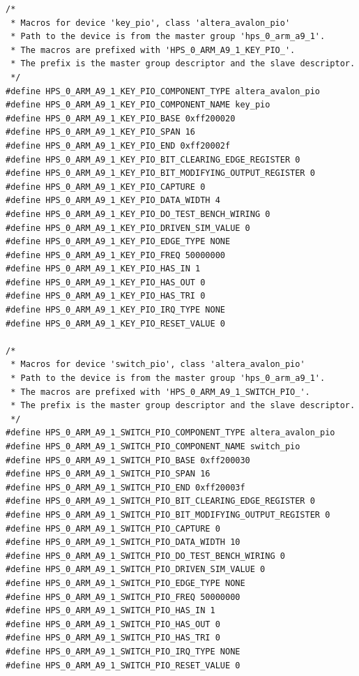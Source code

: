 \documentclass[conference]{IEEEtran}
\begin{document}
\begin{lstlisting}
/*
 * Macros for device 'key_pio', class 'altera_avalon_pio'
 * Path to the device is from the master group 'hps_0_arm_a9_1'.
 * The macros are prefixed with 'HPS_0_ARM_A9_1_KEY_PIO_'.
 * The prefix is the master group descriptor and the slave descriptor.
 */
#define HPS_0_ARM_A9_1_KEY_PIO_COMPONENT_TYPE altera_avalon_pio
#define HPS_0_ARM_A9_1_KEY_PIO_COMPONENT_NAME key_pio
#define HPS_0_ARM_A9_1_KEY_PIO_BASE 0xff200020
#define HPS_0_ARM_A9_1_KEY_PIO_SPAN 16
#define HPS_0_ARM_A9_1_KEY_PIO_END 0xff20002f
#define HPS_0_ARM_A9_1_KEY_PIO_BIT_CLEARING_EDGE_REGISTER 0
#define HPS_0_ARM_A9_1_KEY_PIO_BIT_MODIFYING_OUTPUT_REGISTER 0
#define HPS_0_ARM_A9_1_KEY_PIO_CAPTURE 0
#define HPS_0_ARM_A9_1_KEY_PIO_DATA_WIDTH 4
#define HPS_0_ARM_A9_1_KEY_PIO_DO_TEST_BENCH_WIRING 0
#define HPS_0_ARM_A9_1_KEY_PIO_DRIVEN_SIM_VALUE 0
#define HPS_0_ARM_A9_1_KEY_PIO_EDGE_TYPE NONE
#define HPS_0_ARM_A9_1_KEY_PIO_FREQ 50000000
#define HPS_0_ARM_A9_1_KEY_PIO_HAS_IN 1
#define HPS_0_ARM_A9_1_KEY_PIO_HAS_OUT 0
#define HPS_0_ARM_A9_1_KEY_PIO_HAS_TRI 0
#define HPS_0_ARM_A9_1_KEY_PIO_IRQ_TYPE NONE
#define HPS_0_ARM_A9_1_KEY_PIO_RESET_VALUE 0

/*
 * Macros for device 'switch_pio', class 'altera_avalon_pio'
 * Path to the device is from the master group 'hps_0_arm_a9_1'.
 * The macros are prefixed with 'HPS_0_ARM_A9_1_SWITCH_PIO_'.
 * The prefix is the master group descriptor and the slave descriptor.
 */
#define HPS_0_ARM_A9_1_SWITCH_PIO_COMPONENT_TYPE altera_avalon_pio
#define HPS_0_ARM_A9_1_SWITCH_PIO_COMPONENT_NAME switch_pio
#define HPS_0_ARM_A9_1_SWITCH_PIO_BASE 0xff200030
#define HPS_0_ARM_A9_1_SWITCH_PIO_SPAN 16
#define HPS_0_ARM_A9_1_SWITCH_PIO_END 0xff20003f
#define HPS_0_ARM_A9_1_SWITCH_PIO_BIT_CLEARING_EDGE_REGISTER 0
#define HPS_0_ARM_A9_1_SWITCH_PIO_BIT_MODIFYING_OUTPUT_REGISTER 0
#define HPS_0_ARM_A9_1_SWITCH_PIO_CAPTURE 0
#define HPS_0_ARM_A9_1_SWITCH_PIO_DATA_WIDTH 10
#define HPS_0_ARM_A9_1_SWITCH_PIO_DO_TEST_BENCH_WIRING 0
#define HPS_0_ARM_A9_1_SWITCH_PIO_DRIVEN_SIM_VALUE 0
#define HPS_0_ARM_A9_1_SWITCH_PIO_EDGE_TYPE NONE
#define HPS_0_ARM_A9_1_SWITCH_PIO_FREQ 50000000
#define HPS_0_ARM_A9_1_SWITCH_PIO_HAS_IN 1
#define HPS_0_ARM_A9_1_SWITCH_PIO_HAS_OUT 0
#define HPS_0_ARM_A9_1_SWITCH_PIO_HAS_TRI 0
#define HPS_0_ARM_A9_1_SWITCH_PIO_IRQ_TYPE NONE
#define HPS_0_ARM_A9_1_SWITCH_PIO_RESET_VALUE 0


\end{lstlisting}
\end{document}
